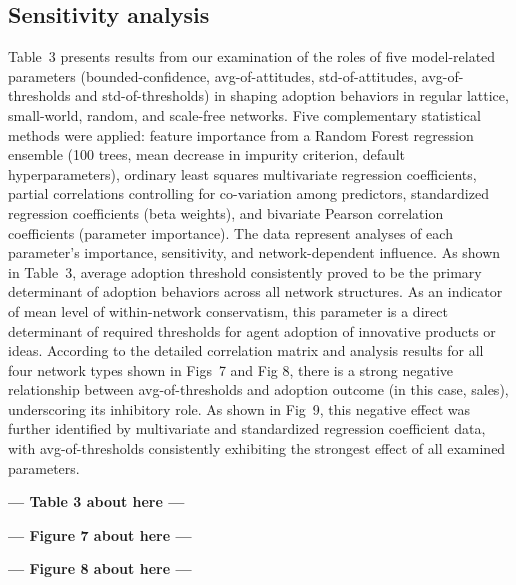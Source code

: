 \documentclass[10pt,letterpaper]{article}
\begin{document}
\subsection*{Sensitivity analysis}

Table~3 presents results from our examination of the roles of five model-related parameters (bounded-confidence, avg-of-attitudes, std-of-attitudes, avg-of-thresholds and std-of-thresholds) in shaping adoption behaviors in regular lattice, small-world, random, and scale-free networks. Five complementary statistical methods were applied: feature importance from a Random Forest regression ensemble (100 trees, mean decrease in impurity criterion, default hyperparameters), ordinary least squares multivariate regression coefficients, partial correlations controlling for co-variation among predictors, standardized regression coefficients (beta weights), and bivariate Pearson correlation coefficients (parameter importance). The data represent analyses of each parameter's importance, sensitivity, and network-dependent influence. As shown in Table~3, average adoption threshold consistently proved to be the primary determinant of adoption behaviors across all network structures. As an indicator of mean level of within-network conservatism, this parameter is a direct determinant of required thresholds for agent adoption of innovative products or ideas. According to the detailed correlation matrix and analysis results for all four network types shown in Figs~7 and Fig 8, there is a strong negative relationship between avg-of-thresholds and adoption outcome (in this case, sales), underscoring its inhibitory role. As shown in Fig~9, this negative effect was further identified by multivariate and standardized regression coefficient data, with avg-of-thresholds consistently exhibiting the strongest effect of all examined parameters.



\begin{center}\textbf{--- Table 3 about here ---}\end{center}




\begin{center}\textbf{--- Figure 7 about here ---}\end{center}




\begin{center}\textbf{--- Figure 8 about here ---}\end{center}
\end{document}

